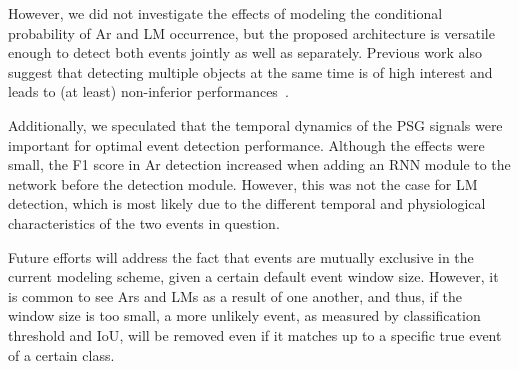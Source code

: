 However, we did not investigate the effects of modeling the conditional probability of \ac{Ar} and \ac{LM} occurrence, but the proposed architecture is versatile enough to detect both events jointly as well as separately. 
Previous work also suggest that detecting multiple objects at the same time is of high interest and leads to (at least) non-inferior performances~\cite{Chambon2018b, Chambon2019, Redmon2016a, Redmon2016b, Liu2016}.

Additionally, we speculated that the temporal dynamics of the \ac{PSG} signals were important for optimal event detection performance. 
Although the effects were small, the F1 score in \ac{Ar} detection increased when adding an \ac{RNN} module to the network before the detection module. 
However, this was not the case for \ac{LM} detection, which is most likely due to the different temporal and physiological characteristics of the two events in question. 

Future efforts will address the fact that events are mutually exclusive in the current modeling scheme, given a certain default event window size. 
However, it is common to see \acp{Ar} and \acp{LM} as a result of one another, and thus, if the window size is too small, a more unlikely event, as measured by classification threshold and \ac{IoU}, will be removed even if it matches up to a specific true event of a certain class. 